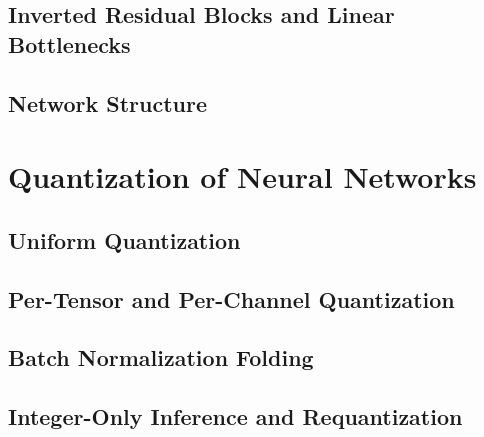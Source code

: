 \subsection{Inverted Residual Blocks and Linear Bottlenecks}
\label{sec:inverted-residual}

\subsection{Network Structure}
\label{sec:mbv2-structure}

\section{Quantization of Neural Networks}
\label{sec:quantization}

\subsection{Uniform Quantization}
\label{sec:uniform-quant}

\subsection{Per-Tensor and Per-Channel Quantization}
\label{sec:per-channel}

\subsection{Batch Normalization Folding}
\label{sec:bn-folding}

\subsection{Integer-Only Inference and Requantization}
\label{sec:requant-theory}

